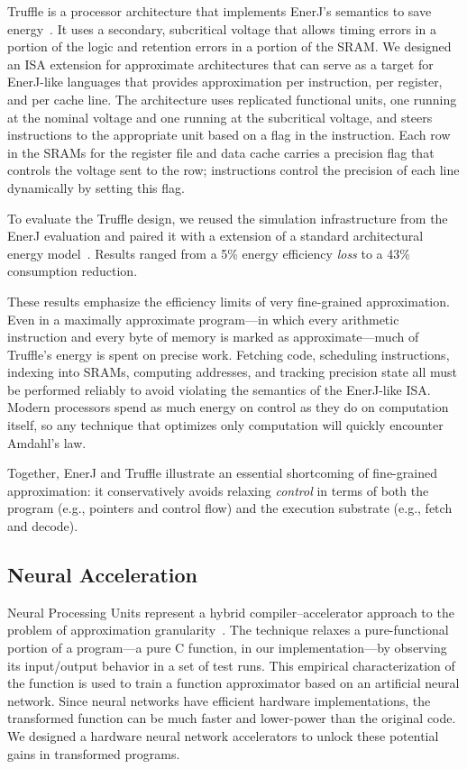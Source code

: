 Truffle is a processor architecture that implements EnerJ's semantics to save
energy~\cite{truffle}. It uses a secondary, subcritical voltage that allows timing errors in
a portion of the logic and retention errors in a portion of the SRAM.
We
designed an ISA extension for approximate architectures that can serve as a
target for EnerJ-like languages that provides approximation per instruction,
per register, and per cache line.
The architecture uses replicated functional units, one running at the nominal
voltage and one running at the subcritical voltage, and steers instructions to the
appropriate unit based on a flag in the instruction. Each row in the SRAMs for
the register file and data cache carries a precision flag that controls the
voltage sent to the row; instructions control the precision of each line
dynamically by setting this flag.

To evaluate the Truffle design,
we reused the simulation infrastructure from the EnerJ evaluation and paired
it with a extension of a standard architectural energy model~\cite{mcpat}.
Results ranged from a 5\% energy efficiency \emph{loss} to a 43\%
consumption reduction.

These results emphasize the efficiency limits of very fine-grained
approximation. Even in a maximally approximate program---in which every
arithmetic instruction and every byte of memory is marked as
approximate---much of Truffle's energy is spent on precise work. Fetching
code, scheduling instructions, indexing into SRAMs, computing addresses, and
tracking precision state all must be performed reliably to avoid violating
the semantics of the EnerJ-like ISA.
Modern processors spend as much energy on
control as they do on computation itself, so any technique that optimizes only
computation will quickly encounter Amdahl's law.

Together, EnerJ and Truffle illustrate an essential shortcoming of
fine-grained approximation: it conservatively avoids relaxing \emph{control}
in terms of both the program (e.g., pointers and control flow) and the
execution substrate (e.g., fetch and decode).


\subsection{Neural Acceleration}

Neural Processing Units represent a hybrid compiler--accelerator approach to
the problem of approximation granularity~\cite{npu}. The technique relaxes a
pure-functional portion of a program---a pure C function, in our
implementation---by observing its input/output behavior in a set of test runs.
This empirical characterization of the function is used to train a function
approximator based on an artificial neural network. Since neural networks have
efficient hardware implementations, the transformed function can be much
faster and lower-power than the original code. We designed a hardware neural
network accelerators to unlock these potential gains in transformed programs.

